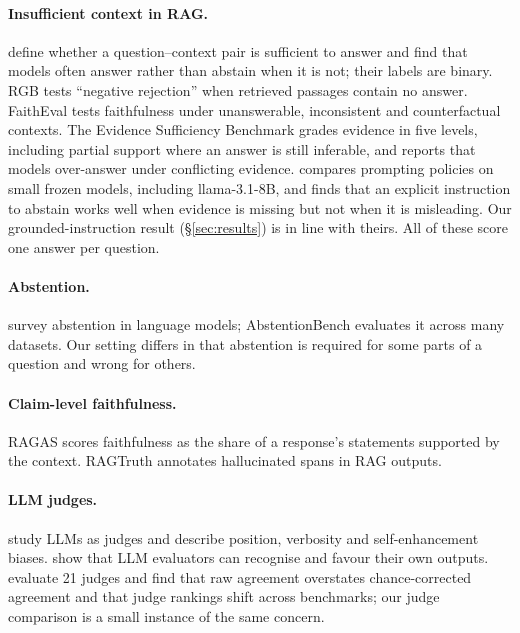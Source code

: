 \documentclass[11pt]{article}
\begin{document}
\paragraph{Insufficient context in RAG.} \citet{joren2025sufficient} define whether a question--context pair is sufficient to answer and find that models often answer rather than abstain when it is not; their labels are binary. RGB \citep{chen2024rgb} tests ``negative rejection'' when retrieved passages contain no answer. FaithEval \citep{ming2024faitheval} tests faithfulness under unanswerable, inconsistent and counterfactual contexts. The Evidence Sufficiency Benchmark \citep{zhang2026esb} grades evidence in five levels, including partial support where an answer is still inferable, and reports that models over-answer under conflicting evidence. \citet{setiawan2026promptabstention} compares prompting policies on small frozen models, including llama-3.1-8B, and finds that an explicit instruction to abstain works well when evidence is missing but not when it is misleading. Our grounded-instruction result (\S\ref{sec:results}) is in line with theirs. All of these score one answer per question.

\paragraph{Abstention.} \citet{wen2024knowyourlimits} survey abstention in language models; AbstentionBench \citep{kirichenko2025abstentionbench} evaluates it across many datasets. Our setting differs in that abstention is required for some parts of a question and wrong for others.

\paragraph{Claim-level faithfulness.} RAGAS \citep{es2024ragas} scores faithfulness as the share of a response's statements supported by the context. RAGTruth \citep{niu2024ragtruth} annotates hallucinated spans in RAG outputs.

\paragraph{LLM judges.} \citet{zheng2023judging} study LLMs as judges and describe position, verbosity and self-enhancement biases. \citet{panickssery2024selfpreference} show that LLM evaluators can recognise and favour their own outputs. \citet{norman2026reliability} evaluate 21 judges and find that raw agreement overstates chance-corrected agreement and that judge rankings shift across benchmarks; our judge comparison is a small instance of the same concern.
\end{document}
